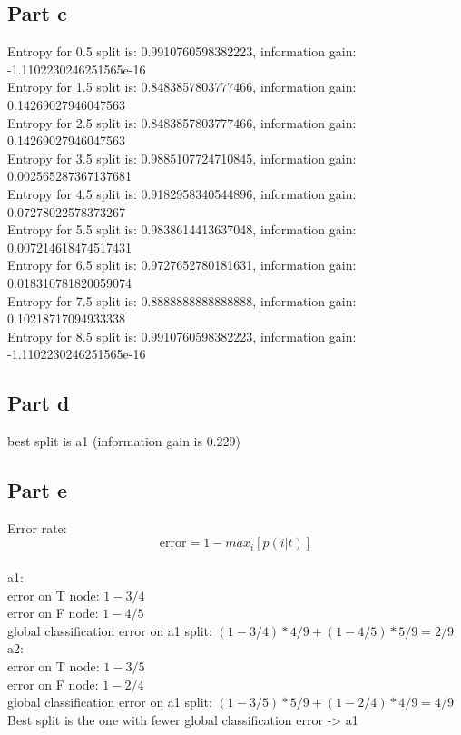 \documentclass[a4paper, 10pt]{article}
\begin{document}
\subsection{Part c}
Entropy for 0.5 split is: 0.9910760598382223, information gain: -1.1102230246251565e-16
\\
Entropy for 1.5 split is: 0.8483857803777466, information gain: 0.14269027946047563
\\
Entropy for 2.5 split is: 0.8483857803777466, information gain: 0.14269027946047563
\\
Entropy for 3.5 split is: 0.9885107724710845, information gain: 0.002565287367137681
\\
Entropy for 4.5 split is: 0.9182958340544896, information gain: 0.07278022578373267
\\
Entropy for 5.5 split is: 0.9838614413637048, information gain: 0.007214618474517431
\\
Entropy for 6.5 split is: 0.9727652780181631, information gain: 0.018310781820059074
\\
Entropy for 7.5 split is: 0.8888888888888888, information gain: 0.10218717094933338
\\
Entropy for 8.5 split is: 0.9910760598382223, information gain: -1.1102230246251565e-16

\subsection{Part d}

best split is a1 (information gain is 0.229)

\subsection{Part e}
Error rate:
$$
\text{error} = 1 - {max}_i [p(i\vert t)]
$$
\\
a1: 
\\
error on T node: $1-3/4$
\\
error on F node: $1-4/5$
\\
global classification error on a1 split: $ (1-3/4)*4/9 + (1-4/5)*5/9 = 2/9$
\\
a2: 
\\
error on T node: $1-3/5$
\\
error on F node: $1-2/4$
\\
global classification error on a1 split: $ (1-3/5)*5/9 + (1-2/4)*4/9 = 4/9$
\\
Best split is the one with fewer global classification error -> a1
\end{document}
